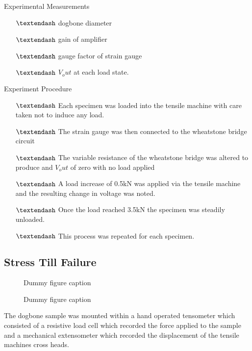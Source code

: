 \documentclass[a4paper,10pt]{article}
\begin{document}
Experimental  Measurements
\begin{itemize}
\item[$\textendash$] dogbone diameter
\item[$\textendash$] gain of amplifier
\item[$\textendash$] gauge factor of strain gauge
\item[$\textendash$] $V_out$ at each load state.
\end{itemize}
Experiment Procedure
\begin{itemize}
\item[$\textendash$] Each specimen was loaded into the tensile machine with care taken not to induce any load.
\item[$\textendash$] The strain gauge was then connected to the wheatstone bridge circuit
\item[$\textendash$] The variable resistance of the wheatstone bridge was altered to produce and $V_out$ of zero with no load applied
\item[$\textendash$] A load increase of 0.5kN was applied via the tensile machine and the resulting change in voltage was noted.
\item[$\textendash$] Once the load reached 3.5kN the specimen was steadily unloaded.
\item[$\textendash$] This process was repeated for each specimen.
\end{itemize}

\subsection{Stress Till Failure}

\begin{figure}[h]
  \caption{Dummy figure caption}
  \label{fig:dummy 1}
\end{figure}
\begin{figure}[h]
  \caption{Dummy figure caption}
  \label{fig:dummy 1}
\end{figure}

The dogbone sample was mounted within a hand  operated tensometer which consisted of a resistive load cell which recorded the force applied to the sample and a mechanical extensometer which recorded the displacement of the tensile machines cross heads.
\end{document}
